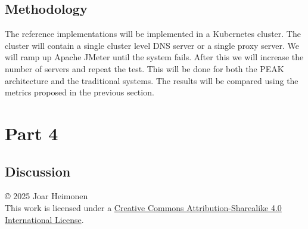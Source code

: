 \documentclass[12pt]{article}
\newcommand{\license}{
    \vspace{1em}
    \noindent\small{© 2025 Joar Heimonen\\
    This work is licensed under a \href{https://creativecommons.org/licenses/by-sa/4.0/}{Creative Commons Attribution-Sharealike 4.0 International License}.}
    \vspace{1em}
}
\begin{document}
\subsection{Methodology}
The reference implementations will be implemented in a Kubernetes cluster. The cluster will contain a single cluster level DNS server \cite{heimonenPreprintPEAKProxy} or a single proxy server.
We will ramp up Apache JMeter \cite{ApacheJMeterApache} until the system fails. After this we will increase the number of servers and repeat the test. 
This will be done for both the PEAK architecture and the traditional systems.
The results will be compared using the metrics proposed in the previous section.

\section{Part 4}
\subsection{Discussion}




\printbibliography
\license
\end{document}
